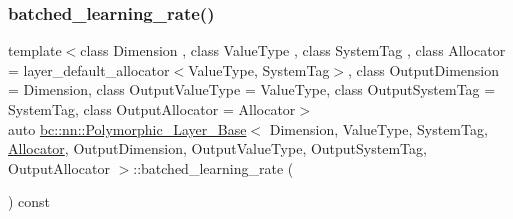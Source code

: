 \mbox{\label{structbc_1_1nn_1_1Polymorphic__Layer__Base_a4a592f412e5a7908293385d2e1f567d5}} 
\subsubsection{\texorpdfstring{batched\+\_\+learning\+\_\+rate()}{batched\_learning\_rate()}\hspace{0.1cm}{\footnotesize\ttfamily [1/2]}}
{\footnotesize\ttfamily template$<$class Dimension , class Value\+Type , class System\+Tag , class Allocator  = layer\+\_\+default\+\_\+allocator$<$\+Value\+Type, System\+Tag$>$, class Output\+Dimension  = Dimension, class Output\+Value\+Type  = Value\+Type, class Output\+System\+Tag  = System\+Tag, class Output\+Allocator  = Allocator$>$ \\
auto \hyperlink{structbc_1_1nn_1_1Polymorphic__Layer__Base}{bc\+::nn\+::\+Polymorphic\+\_\+\+Layer\+\_\+\+Base}$<$ Dimension, Value\+Type, System\+Tag, \hyperlink{classbc_1_1allocators_1_1Allocator}{Allocator}, Output\+Dimension, Output\+Value\+Type, Output\+System\+Tag, Output\+Allocator $>$\+::batched\+\_\+learning\+\_\+rate (\begin{DoxyParamCaption}{ }\end{DoxyParamCaption}) const\hspace{0.3cm}{\ttfamily [inline]}}

\mbox{\label{structbc_1_1nn_1_1Polymorphic__Layer__Base_a4a592f412e5a7908293385d2e1f567d5}} 
